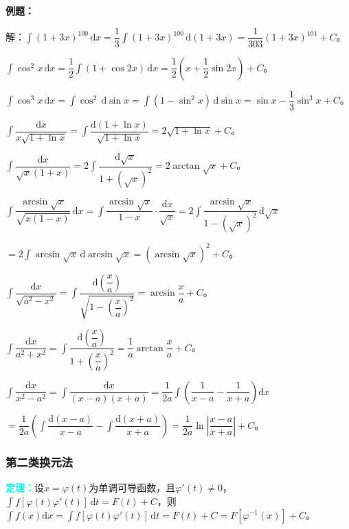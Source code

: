 \documentclass[UTF8, 12pt]{ctexart}
\begin{document}
\textbf{例题：}

解：$\int(1+3x)^{100}\,\textrm{d}x=\dfrac{1}{3}\int(1+3x)^{100}\,\textrm{d}(1+3x)=\dfrac{1}{303}(1+3x)^{101}+C$。

$\int\cos^2x\,\textrm{d}x=\dfrac{1}{2}\int(1+\cos 2x)\,\textrm{d}x=\dfrac{1}{2}\left(x+\dfrac{1}{2}\sin 2x\right)+C$。

$\int\cos^3x\,\textrm{d}x=\int\cos^2\,\textrm{d}\sin x=\int(1-\sin^2x)\,\textrm{d}\sin x=\sin x-\dfrac{1}{3}\sin^3x+C$。\medskip

$\displaystyle{\int\dfrac{\textrm{d}x}{x\sqrt{1+\ln x}}=\int\dfrac{\textrm{d}(1+\ln x)}{\sqrt{1+\ln x}}}=2\sqrt{1+\ln x}+C$。\medskip

$\displaystyle{\int\dfrac{\textrm{d}x}{\sqrt{x}(1+x)}=2\int\dfrac{\textrm{d}\sqrt{x}}{1+(\sqrt{x})^2}}=2\arctan\sqrt{x}+C$。\medskip

$\displaystyle{\int\dfrac{\arcsin\sqrt{x}}{\sqrt{x(1-x)}}\,\textrm{d}x=\int\dfrac{\arcsin\sqrt{x}}{1-x}\cdot\dfrac{\textrm{d}x}{\sqrt{x}}=2\int\dfrac{\arcsin\sqrt{x}}{1-(\sqrt{x})^2}\,\textrm{d}\sqrt{x}}$ \medskip

$=2\int\arcsin\sqrt{x}\,\textrm{d}\arcsin\sqrt{x}=(\arcsin\sqrt{x})^2+C$。\medskip

$\displaystyle{\int\dfrac{\textrm{d}x}{\sqrt{a^2-x^2}}}=\displaystyle{\int\dfrac{\textrm{d}\left(\dfrac{x}{a}\right)}{\sqrt{1-\left(\dfrac{x}{a}\right)^2}}}=\arcsin\dfrac{x}{a}+C$。

$\displaystyle{\int\dfrac{\textrm{d}x}{a^2+x^2}}=\displaystyle{\int\dfrac{\textrm{d}\left(\dfrac{x}{a}\right)}{1+\left(\dfrac{x}{a}\right)^2}}=\dfrac{1}{a}\arctan\dfrac{x}{a}+C$。\medskip

$\displaystyle{\int\dfrac{\textrm{d}x}{x^2-a^2}}=\displaystyle{\int\dfrac{\textrm{d}x}{(x-a)(x+a)}}=\dfrac{1}{2a}\displaystyle{\int\left(\dfrac{1}{x-a}-\dfrac{1}{x+a}\right)\textrm{d}x}$ \medskip

$=\dfrac{1}{2a}\left(\displaystyle{\int\dfrac{\textrm{d}(x-a)}{x-a}-\int\dfrac{\textrm{d}(x+a)}{x+a}}\right)=\dfrac{1}{2a}\ln\left\vert\dfrac{x-a}{x+a}\right\vert+C$。

\subsubsection{第二类换元法}

\textcolor{aqua}{\textbf{定理：}}设$x=\varphi(t)$为单调可导函数，且$\varphi'(t)\neq 0$，$\int f[\varphi(t)\varphi'(t)]\,\textrm{d}t=F(t)+C$，则$\int f(x)\textrm{d}x=\int f[\varphi(t)\varphi'(t)]\,\textrm{d}t=F(t)+C=F[\varphi^{-1}(x)]+C$。
\end{document}
